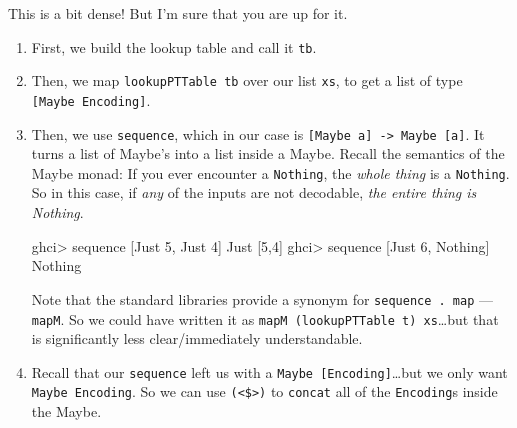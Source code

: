 \documentclass[]{article}
\newenvironment{Shaded}{}{}
\newcommand{\DataTypeTok}[1]{\textcolor[rgb]{0.56,0.13,0.00}{#1}}
\newcommand{\DecValTok}[1]{\textcolor[rgb]{0.25,0.63,0.44}{#1}}
\newcommand{\FunctionTok}[1]{\textcolor[rgb]{0.02,0.16,0.49}{#1}}
\newcommand{\NormalTok}[1]{#1}
\newcommand{\OperatorTok}[1]{\textcolor[rgb]{0.40,0.40,0.40}{#1}}
\begin{document}
This is a bit dense! But I'm sure that you are up for it.

\begin{enumerate}
\def\labelenumi{\arabic{enumi}.}
\item
  First, we build the lookup table and call it \texttt{tb}.
\item
  Then, we map \texttt{lookupPTTable\ tb} over our list \texttt{xs}, to get a
  list of type \texttt{{[}Maybe\ Encoding{]}}.
\item
  Then, we use \texttt{sequence}, which in our case is
  \texttt{{[}Maybe\ a{]}\ -\textgreater{}\ Maybe\ {[}a{]}}. It turns a list of
  Maybe's into a list inside a Maybe. Recall the semantics of the Maybe monad:
  If you ever encounter a \texttt{Nothing}, the \emph{whole thing} is a
  \texttt{Nothing}. So in this case, if \emph{any} of the inputs are not
  decodable, \emph{the entire thing is Nothing}.

\begin{Shaded}
\begin{Highlighting}[]
\NormalTok{ghci}\OperatorTok{>} \FunctionTok{sequence}\NormalTok{ [}\DataTypeTok{Just} \DecValTok{5}\NormalTok{, }\DataTypeTok{Just} \DecValTok{4}\NormalTok{]}
\DataTypeTok{Just}\NormalTok{ [}\DecValTok{5}\NormalTok{,}\DecValTok{4}\NormalTok{]}
\NormalTok{ghci}\OperatorTok{>} \FunctionTok{sequence}\NormalTok{ [}\DataTypeTok{Just} \DecValTok{6}\NormalTok{, }\DataTypeTok{Nothing}\NormalTok{]}
\DataTypeTok{Nothing}
\end{Highlighting}
\end{Shaded}

  Note that the standard libraries provide a synonym for
  \texttt{sequence\ .\ map} --- \texttt{mapM}. So we could have written it as
  \texttt{mapM\ (lookupPTTable\ t)\ xs}\ldots but that is significantly less
  clear/immediately understandable.
\item
  Recall that our \texttt{sequence} left us with a
  \texttt{Maybe\ {[}Encoding{]}}\ldots but we only want
  \texttt{Maybe\ Encoding}. So we can use \texttt{(\textless{}\$\textgreater{})}
  to \texttt{concat} all of the \texttt{Encoding}s inside the Maybe.
\end{enumerate}
\end{document}
